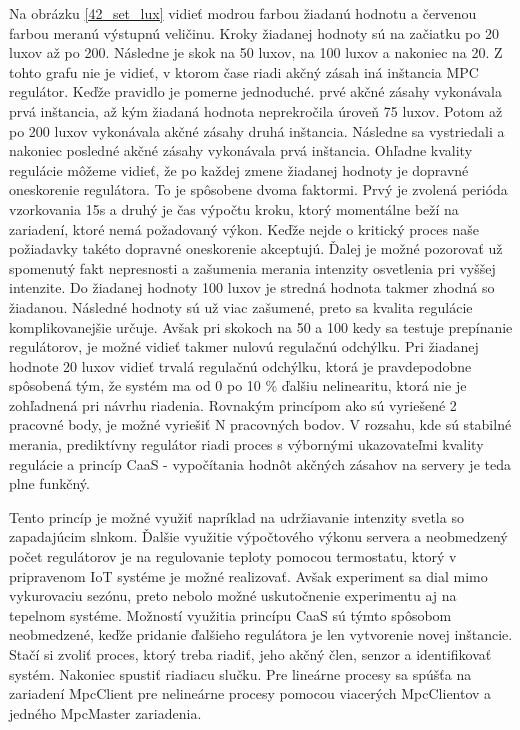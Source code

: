 Na obrázku \ref{42_set_lux} vidieť modrou farbou žiadanú hodnotu a červenou farbou meranú výstupnú veličinu. Kroky žiadanej hodnoty sú na začiatku po 20 luxov až po 200. Následne je skok na 50 luxov, na 100 luxov a nakoniec na 20. Z tohto grafu nie je vidieť, v ktorom čase riadi akčný zásah iná inštancia MPC regulátor. Keďže pravidlo je pomerne jednoduché. prvé akčné zásahy vykonávala prvá inštancia, až kým žiadaná hodnota neprekročila úroveň 75 luxov. Potom až po 200 luxov vykonávala akčné zásahy druhá inštancia. Následne sa vystriedali a nakoniec posledné akčné zásahy vykonávala prvá inštancia. Ohľadne kvality regulácie môžeme vidieť, že po každej zmene žiadanej hodnoty je dopravné oneskorenie regulátora. To je spôsobene dvoma faktormi. Prvý je zvolená perióda vzorkovania 15s a druhý je čas výpočtu kroku, ktorý momentálne beží na zariadení, ktoré nemá požadovaný výkon. Keďže nejde o kritický proces naše požiadavky takéto dopravné oneskorenie akceptujú. Ďalej je možné pozorovať už spomenutý fakt nepresnosti a zašumenia merania intenzity osvetlenia pri vyššej intenzite. Do žiadanej hodnoty 100 luxov je stredná hodnota takmer zhodná so žiadanou. Následné hodnoty sú už viac zašumené, preto sa kvalita regulácie komplikovanejšie určuje. Avšak pri skokoch na 50 a 100 kedy sa testuje prepínanie regulátorov, je možné vidieť takmer nulovú regulačnú odchýlku. Pri žiadanej hodnote 20 luxov vidieť trvalá regulačnú odchýlku, ktorá je pravdepodobne spôsobená tým, že systém ma od 0 po 10 \% ďalšiu nelinearitu, ktorá nie je zohľadnená pri návrhu riadenia. Rovnakým princípom ako sú vyriešené 2 pracovné body, je možné vyriešiť N pracovných bodov. V rozsahu, kde sú stabilné merania, prediktívny regulátor riadi proces s výbornými ukazovateľmi kvality regulácie a princíp CaaS - vypočítania hodnôt akčných zásahov na servery je teda plne funkčný.

\indent Tento princíp je možné využiť napríklad na udržiavanie intenzity svetla so zapadajúcim slnkom. Ďalšie využitie výpočtového výkonu servera a neobmedzený počet regulátorov je na regulovanie teploty pomocou termostatu, ktorý v pripravenom IoT systéme je možné realizovať. Avšak experiment sa dial mimo vykurovaciu sezónu, preto nebolo možné uskutočnenie experimentu aj na tepelnom systéme. Možností využitia princípu CaaS sú týmto spôsobom neobmedzené, keďže pridanie ďalšieho regulátora je len vytvorenie novej inštancie. Stačí si zvoliť proces, ktorý treba riadiť, jeho akčný člen, senzor a identifikovať systém. Nakoniec spustiť riadiacu slučku. Pre lineárne procesy sa spúšťa na zariadení MpcClient pre nelineárne procesy pomocou viacerých MpcClientov a jedného MpcMaster zariadenia.

